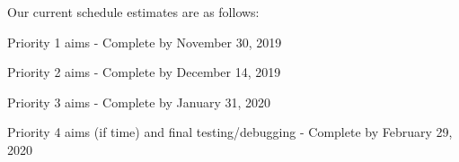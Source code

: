 Our current schedule estimates are as follows:

Priority 1 aims - Complete by November 30, 2019

Priority 2 aims - Complete by December 14, 2019

Priority 3 aims - Complete by January 31, 2020

Priority 4 aims (if time) and final testing/debugging - Complete by February 29, 2020